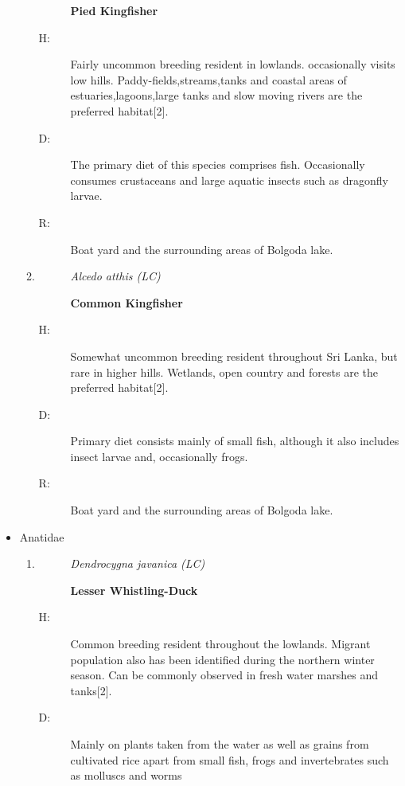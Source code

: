 \begin{itemize}
\begin{enumerate}
\begin{description}
\textbf{Pied Kingfisher}%
\end{description}%
\begin{description}%
\item[H: ]%
Fairly uncommon breeding resident in lowlands. occasionally visits low hills. Paddy-fields,streams,tanks and coastal areas of estuaries,lagoons,large tanks and slow moving rivers are the preferred habitat{[}2{]}.%
\newpage
\item[D: ]%
The primary diet of this species comprises fish. Occasionally consumes crustaceans and large aquatic insects such as dragonfly larvae.%
\item[R: ]%
Boat yard and the surrounding areas of Bolgoda lake.%
\end{description}%
\item%
\begin{description}%
\item[]%
\textit{Alcedo atthis (LC)}%
\item[]%
\textbf{Common Kingfisher}%
\end{description}%
\begin{description}%
\item[H: ]%
Somewhat uncommon breeding resident throughout Sri Lanka, but rare in higher hills. Wetlands, open country and forests are the preferred habitat{[}2{]}.%
\item[D: ]%
Primary diet consists mainly of small fish, although it also includes insect larvae and, occasionally frogs.%
\item[R: ]%
Boat yard and the surrounding areas of Bolgoda lake.%
\end{description}%
\end{enumerate}%
\item%
Anatidae%
\begin{enumerate}%
\item%
\begin{description}%
\item[]%
\textit{Dendrocygna javanica (LC)}%
\item[]%
\textbf{Lesser Whistling{-}Duck}%
\end{description}%
\begin{description}%
\item[H: ]%
Common breeding resident throughout the lowlands. Migrant population also has been identified during the northern winter season. Can be commonly observed in fresh water marshes and tanks{[}2{]}.%
\item[D: ]%
Mainly on plants taken from the water as well as grains from cultivated rice apart from small fish, frogs and invertebrates such as molluscs and worms%

\end{description}
\end{enumerate}
\end{itemize}
